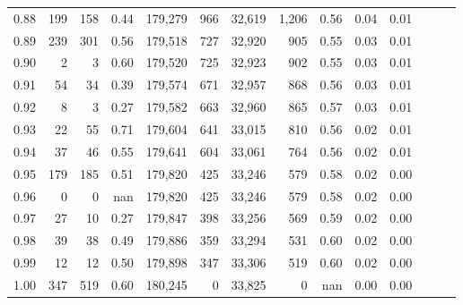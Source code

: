 \begin{tabular}{rrrrrrrrrrrrrr}
0.88 &     199 &    158 &  0.44 &  179,279 &      966 &  32,619 &   1,206 &  0.56 &  0.04 &      0.01 \\
0.89 &     239 &    301 &  0.56 &  179,518 &      727 &  32,920 &     905 &  0.55 &  0.03 &      0.01 \\
0.90 &       2 &      3 &  0.60 &  179,520 &      725 &  32,923 &     902 &  0.55 &  0.03 &      0.01 \\
0.91 &      54 &     34 &  0.39 &  179,574 &      671 &  32,957 &     868 &  0.56 &  0.03 &      0.01 \\
0.92 &       8 &      3 &  0.27 &  179,582 &      663 &  32,960 &     865 &  0.57 &  0.03 &      0.01 \\
0.93 &      22 &     55 &  0.71 &  179,604 &      641 &  33,015 &     810 &  0.56 &  0.02 &      0.01 \\
0.94 &      37 &     46 &  0.55 &  179,641 &      604 &  33,061 &     764 &  0.56 &  0.02 &      0.01 \\
0.95 &     179 &    185 &  0.51 &  179,820 &      425 &  33,246 &     579 &  0.58 &  0.02 &      0.00 \\
0.96 &       0 &      0 &   nan &  179,820 &      425 &  33,246 &     579 &  0.58 &  0.02 &      0.00 \\
0.97 &      27 &     10 &  0.27 &  179,847 &      398 &  33,256 &     569 &  0.59 &  0.02 &      0.00 \\
0.98 &      39 &     38 &  0.49 &  179,886 &      359 &  33,294 &     531 &  0.60 &  0.02 &      0.00 \\
0.99 &      12 &     12 &  0.50 &  179,898 &      347 &  33,306 &     519 &  0.60 &  0.02 &      0.00 \\
1.00 &     347 &    519 &  0.60 &  180,245 &        0 &  33,825 &       0 &   nan &  0.00 &      0.00 \\
\bottomrule
\end{tabular}
